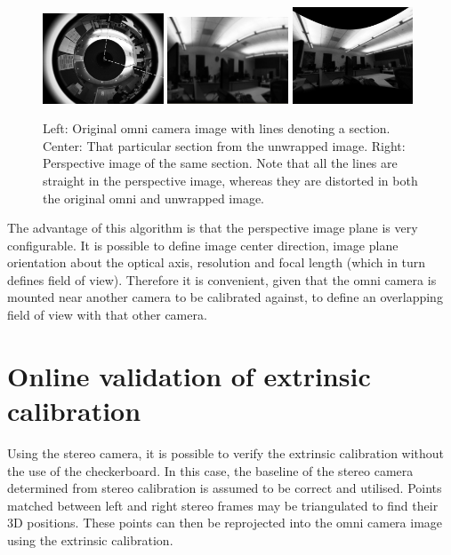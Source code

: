 \begin{figure}[b!]
  \centering
    \includegraphics[width=0.32\textwidth]{chapters/images/omni_raw_office}
    \includegraphics[width=0.32\textwidth]{chapters/images/unwrapped_office}
    \includegraphics[width=0.32\textwidth]{chapters/images/perspective_office}
  \caption{Left: Original omni camera image with lines denoting a section.  Center: That particular section from the unwrapped image.  Right: Perspective image of the same section.  Note that all the lines are straight in the perspective image, whereas they are distorted in both the original omni and unwrapped image.}
  \label{fig:omni_images}
\end{figure}

The advantage of this algorithm is that the perspective image plane is very configurable.  It is possible to define image center direction, image plane orientation about the optical axis, resolution and focal length (which in turn defines field of view).  Therefore it is convenient, given that the omni camera is mounted near another camera to be calibrated against, to define an overlapping field of view with that other camera. %

\section{Online validation of extrinsic calibration}
\label{sec:verification_tool}

Using the stereo camera, it is possible to verify the extrinsic calibration without the use of the checkerboard.  In this case, the baseline of the stereo camera determined from stereo calibration is assumed to be correct and utilised.  Points matched between left and right stereo frames may be triangulated to find their 3D positions.  These points can then be reprojected into the omni camera image using the extrinsic calibration.

